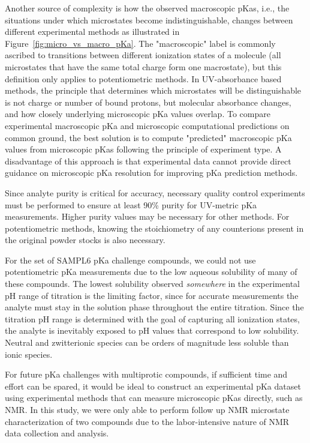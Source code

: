 \documentclass[9pt,lineno]{elife}
\begin{document}
Another source of complexity is how the observed macroscopic pKas, i.e., the situations under which microstates become indistinguishable, changes between different experimental methods as illustrated in Figure~\ref{fig:micro_vs_macro_pKa}. 
The "macroscopic" label is commonly ascribed to transitions between different ionization states of a molecule (all microstates that have the same total charge form one macrostate), but this definition only applies to potentiometric methods. 
In UV-absorbance based methods, the principle that determines which microstates will be distinguishable is not charge or number of bound protons, but molecular absorbance changes, and how closely underlying microscopic pKa values overlap. 
To compare experimental macroscopic pKa and microscopic computational predictions on common ground, the best solution is to compute "predicted" macroscopic pKa values from microscopic pKas following the principle of experiment type. 
A disadvantage of this approach is that experimental data cannot provide direct guidance on microscopic pKa resolution for improving pKa prediction methods.

Since analyte purity is critical for accuracy, necessary quality control experiments must be performed to ensure at least 90\% purity for UV-metric pKa measurements. Higher purity values may be necessary for other methods. 
For potentiometric methods, knowing the stoichiometry of any counterions present in the original powder stocks is also necessary.

For the set of SAMPL6 pKa challenge compounds, we could not use potentiometric pKa measurements due to the low aqueous solubility of many of these compounds. The lowest solubility observed \emph{somewhere} in the experimental pH range of titration is the limiting factor, since for accurate measurements the analyte must stay in the solution phase throughout the entire titration. 
Since the titration pH range is determined with the goal of capturing all ionization states, the analyte is inevitably exposed to pH values that correspond to low solubility. 
Neutral and zwitterionic species can be orders of magnitude less soluble than ionic species. 

For future pKa challenges with multiprotic compounds, if sufficient time and effort can be spared, it would be ideal to construct an experimental pKa dataset using experimental methods that can measure microscopic pKas directly, such as NMR. 
In this study, we were only able to perform follow up NMR microstate characterization of two compounds due to the labor-intensive nature of NMR data collection and analysis. 
\end{document}
